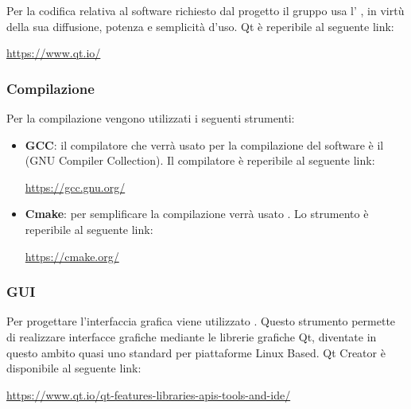 \documentclass[../NormediProgetto.tex]{subfiles}
\begin{document}
	Per la codifica relativa al software richiesto dal progetto il gruppo usa l' , in virtù della sua diffusione, potenza e semplicità d'uso. Qt è reperibile al seguente link:
	
	\begin{center}
		\centerline{\url{https://www.qt.io/}}
	\end{center}

	\subsubsection{Compilazione}

	Per la compilazione vengono utilizzati i seguenti strumenti:

	\begin{itemize}
		\item \textbf{GCC}: il compilatore che verrà usato per la compilazione del software è il  (GNU Compiler Collection). Il compilatore è reperibile al seguente link:
		
		\begin{center}
			\centerline{\url{https://gcc.gnu.org/}}
		\end{center}
	
		\item \textbf{Cmake}: per semplificare la compilazione verrà usato . Lo strumento è reperibile al seguente link:
		
		\begin{center}
			\centerline{\url{https://cmake.org/}}
		\end{center}
	
	\end{itemize}

	\subsubsection{GUI}

	Per progettare l'interfaccia grafica viene utilizzato . Questo strumento permette di realizzare interfacce grafiche mediante le librerie grafiche Qt, diventate in questo ambito quasi uno standard per piattaforme Linux Based. Qt Creator è disponibile al seguente link: 
	
	\begin{center}
		\centerline{\url{https://www.qt.io/qt-features-libraries-apis-tools-and-ide/}}
	\end{center}
	
\end{document}
